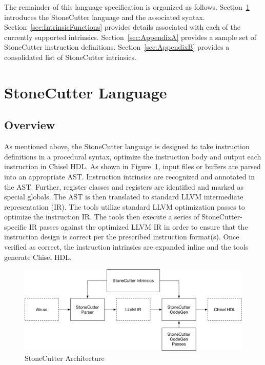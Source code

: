 \documentclass{article}
\begin{document}
The remainder of this language specification is organized as follows.  Section~\ref{sec:StoneCutterLanguage} 
introduces the StoneCutter language and the associated syntax.  Section~\ref{sec:IntrinsicFunctions} provides 
details associated with each of the currently supported intrinsics.  Section~\ref{sec:AppendixA} provides 
a sample set of StoneCutter instruction definitions.  Section~\ref{sec:AppendixB} provides a consolidated list of StoneCutter 
intrinsics.  

 
\clearpage
\section{StoneCutter Language}
\label{sec:StoneCutterLanguage}

\subsection{Overview}
\label{sec:LangOverview}

As mentioned above, the StoneCutter language is designed to take instruction definitions in a procedural syntax, 
optimize the instruction body and output each instruction in Chisel HDL.  As shown in Figure~\ref{fig:SCArch}, input 
files or buffers are parsed into an appropriate AST.  Instruction intrinsics are recognized and annotated in the AST.  Further, 
register classes and registers are identified and marked as special globals.  The AST is then translated to standard 
LLVM intermediate representation (IR).  The tools utilize standard LLVM optimization passes to optimize the instruction IR.  
The tools then execute a series of StoneCutter-specific IR passes against the optimized LLVM IR in order to ensure that the 
instruction design is correct per the prescribed instruction format(s).  Once verified as correct, the instruction intrinsics are expanded inline and the 
tools generate Chisel HDL.

\begin{figure}[h]
\begin{center}
\includegraphics[width=\textwidth]{figures/scarch.pdf}
\vspace*{8pt}
\caption{StoneCutter Architecture}
\label{fig:SCArch}
\end{center}
\end{figure}
\end{document}
